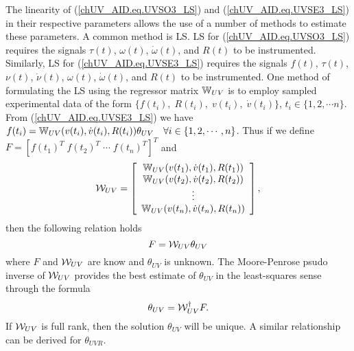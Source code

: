 The linearity of (\ref{chUV_AID.eq.UVSO3_LS}) and
(\ref{chUV_AID.eq.UVSE3_LS}) in their respective parameters allows the
use of a number of methods to estimate these parameters. A common
method is \acf{LS}.
%
\ac{LS} for (\ref{chUV_AID.eq.UVSO3_LS}) requires the signals
$\tau(t)$, $\omega(t)$, $\dot{\omega}(t)$, and $R(t)$ to be
instrumented.
%
Similarly, \ac{LS} for (\ref{chUV_AID.eq.UVSE3_LS}) requires the
signals $f(t)$, $\tau(t)$, $\nu(t)$, $\dot{\nu}(t)$, $\omega(t)$,
$\dot{\omega}(t)$, and $R(t)$ to be instrumented.
%
One method of formulating the \ac{LS} using the regressor matrix
$\mathbb{W}_{UV}$ is to employ sampled experimental data of the form 
$\{f(t_i),\;R(t_i),\;v(t_i),\;\dot{v}(t_i)\}$, $t_i\in\{1,2,\cdots n\}$.
%
From (\ref{chUV_AID.eq.UVSE3_LS}) we have
$f(t_i)=\mathbb{W}_{UV}(v(t_i),\dot{v}(t_i),R(t_i)) \theta_{UV} \quad \forall
i\in\{1,2,\cdots,n\}$.
%
Thus if we define $F=[f(t_1)^T\;f(t_2)^T\;\cdots\;f(t_n)^T]^T$ and
%
\begin{equation}
\mathcal{W}_{UV}=\left[ \begin{array}{c}
 \mathbb{W}_{UV}(v(t_1),\dot{v}(t_1),R(t_1)) \\
 \mathbb{W}_{UV}(v(t_2),\dot{v}(t_2),R(t_2)) \\
 \vdots \\
 \mathbb{W}_{UV}(v(t_n),\dot{v}(t_n),R(t_n)) \\
 \end{array}\right],
\end{equation}
%
\noindent then the following relation holds
%
\begin{equation}
F=\mathcal{W}_{UV}\theta_{UV}
\end{equation}
%
where $F$ and $\mathcal{W}_{UV}$ are know and $\theta_{UV}$ is unknown.  
%
The Moore-Penrose psudo inverse of $\mathcal{W}_{UV}$ provides the
best estimate of $\theta_{UV}$ in the least-squares sense through the
formula
%
\begin{equation}
\theta_{UV}=\mathcal{W}_{UV}^\dagger F.
\end{equation}
%
If $\mathcal{W}_{UV}$ is full rank, then the solution $\theta_{UV}$ will be
unique.  
%
A similar relationship can be derived for $\theta_{UVR}$.

